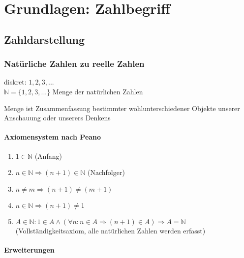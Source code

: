 \chapter{Grundlagen: Zahlbegriff}

\section{Zahldarstellung}
\subsection{Natürliche Zahlen zu reelle Zahlen}
diskret: $1,2,3,...$\\
$\mathbb{N} = \{1,2,3,...\}$ Menge der natürlichen Zahlen
\begin{definition}
 Menge ist Zusammenfassung bestimmter wohlunterschiedener Objekte unserer Anschauung oder unserers Denkens
\end{definition}

\subsubsection*{Axiomensystem nach Peano}
\begin{enumerate}
 \item $1 \in \mathbb{N}$ (Anfang)
 \item $n \in \mathbb{N} \Rightarrow (n+1) \in \mathbb{N}$ (Nachfolger)
 \item $n \neq m \Rightarrow (n+1) \neq (m+1)$
 \item $n \in \mathbb{N} \Rightarrow (n+1) \neq 1$
 \item $A \in \mathbb{N}: 1 \in A \land (\forall n: n \in A \Rightarrow (n+1) \in A) \Rightarrow A = \mathbb{N}$ (Vollständigkeitsaxiom, alle natürlichen Zahlen werden erfasst)
\end{enumerate}

\subsubsection*{Erweiterungen}

